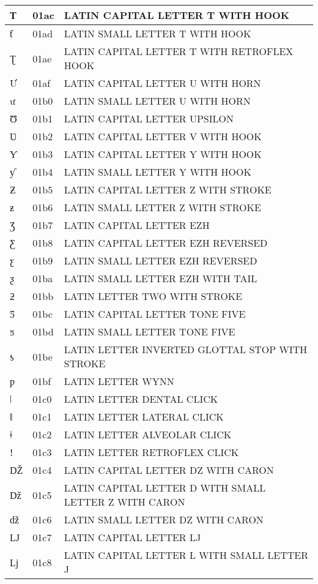 \documentclass[12pt,letterpaper,openany]{book}
\begin{document}
\begin{center}
\begin{supertabular}{|m{0.25in}|m{0.5in}|m{4in}|}
Ƭ & 01ac & LATIN CAPITAL LETTER T WITH HOOK\\\hline
ƭ & 01ad & LATIN SMALL LETTER T WITH HOOK\\\hline
Ʈ & 01ae & LATIN CAPITAL LETTER T WITH RETROFLEX HOOK\\\hline
Ư & 01af & LATIN CAPITAL LETTER U WITH HORN\\\hline
ư & 01b0 & LATIN SMALL LETTER U WITH HORN\\\hline
Ʊ & 01b1 & LATIN CAPITAL LETTER UPSILON\\\hline
Ʋ & 01b2 & LATIN CAPITAL LETTER V WITH HOOK\\\hline
Ƴ & 01b3 & LATIN CAPITAL LETTER Y WITH HOOK\\\hline
ƴ & 01b4 & LATIN SMALL LETTER Y WITH HOOK\\\hline
Ƶ & 01b5 & LATIN CAPITAL LETTER Z WITH STROKE\\\hline
ƶ & 01b6 & LATIN SMALL LETTER Z WITH STROKE\\\hline
Ʒ & 01b7 & LATIN CAPITAL LETTER EZH\\\hline
Ƹ & 01b8 & LATIN CAPITAL LETTER EZH REVERSED\\\hline
ƹ & 01b9 & LATIN SMALL LETTER EZH REVERSED\\\hline
ƺ & 01ba & LATIN SMALL LETTER EZH WITH TAIL\\\hline
ƻ & 01bb & LATIN LETTER TWO WITH STROKE\\\hline
Ƽ & 01bc & LATIN CAPITAL LETTER TONE FIVE\\\hline
ƽ & 01bd & LATIN SMALL LETTER TONE FIVE\\\hline
ƾ & 01be & LATIN LETTER INVERTED GLOTTAL STOP WITH STROKE\\\hline
ƿ & 01bf & LATIN LETTER WYNN\\\hline
ǀ & 01c0 & LATIN LETTER DENTAL CLICK\\\hline
ǁ & 01c1 & LATIN LETTER LATERAL CLICK\\\hline
ǂ & 01c2 & LATIN LETTER ALVEOLAR CLICK\\\hline
ǃ & 01c3 & LATIN LETTER RETROFLEX CLICK\\\hline
Ǆ & 01c4 & LATIN CAPITAL LETTER DZ WITH CARON\\\hline
ǅ & 01c5 & LATIN CAPITAL LETTER D WITH SMALL LETTER Z WITH CARON\\\hline
ǆ & 01c6 & LATIN SMALL LETTER DZ WITH CARON\\\hline
Ǉ & 01c7 & LATIN CAPITAL LETTER LJ\\\hline
ǈ & 01c8 & LATIN CAPITAL LETTER L WITH SMALL LETTER J\\\hline

\end{supertabular}
\end{center}
\end{document}
